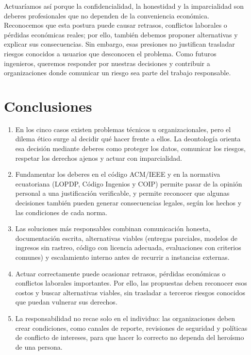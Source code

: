 \documentclass[12pt,a4paper,oneside]{article}
\begin{document}
Actuaríamos así porque la confidencialidad, la honestidad y la imparcialidad son deberes profesionales que no dependen de la conveniencia económica. Reconocemos que esta postura puede causar retrasos, conflictos laborales o pérdidas económicas reales; por ello, también debemos proponer alternativas y explicar sus consecuencias. Sin embargo, esas presiones no justifican trasladar riesgos conocidos a usuarios que desconocen el problema. Como futuros ingenieros, queremos responder por nuestras decisiones y contribuir a organizaciones donde comunicar un riesgo sea parte del trabajo responsable.

\section{Conclusiones}

\begin{enumerate}[leftmargin=1.8em,itemsep=4pt]
    \item En los cinco casos existen problemas técnicos u organizacionales, pero el dilema ético surge al decidir qué hacer frente a ellos. La deontología orienta esa decisión mediante deberes como proteger los datos, comunicar los riesgos, respetar los derechos ajenos y actuar con imparcialidad.
    \item Fundamentar los deberes en el código ACM/IEEE y en la normativa ecuatoriana (LOPDP, Código Ingenios y COIP) permite pasar de la opinión personal a una justificación verificable, y permite reconocer que algunas decisiones también pueden generar consecuencias legales, según los hechos y las condiciones de cada norma.
    \item Las soluciones más responsables combinan comunicación honesta, documentación escrita, alternativas viables (entregas parciales, modelos de ingresos sin rastreo, código con licencia adecuada, evaluaciones con criterios comunes) y escalamiento interno antes de recurrir a instancias externas.
    \item Actuar correctamente puede ocasionar retrasos, pérdidas económicas o conflictos laborales importantes. Por ello, las propuestas deben reconocer esos costos y buscar alternativas viables, sin trasladar a terceros riesgos conocidos que puedan vulnerar sus derechos.
    \item La responsabilidad no recae solo en el individuo: las organizaciones deben crear condiciones, como canales de reporte, revisiones de seguridad y políticas de conflicto de intereses, para que hacer lo correcto no dependa del heroísmo de una persona.
\end{enumerate}
\end{document}
